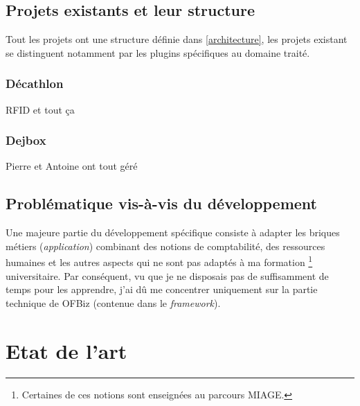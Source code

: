 \subsection{Projets existants et leur structure}
Tout les projets ont une structure définie dans \ref{architecture}, les projets existant se distinguent notamment par les plugins spécifiques au domaine traité. 
\subsubsection{Décathlon}
RFID et tout ça
\subsubsection{Dejbox}
Pierre et Antoine ont tout géré 

\subsection{Problématique vis-à-vis du développement}
\label{probfonctionnel}
Une majeure partie du développement spécifique consiste à adapter les briques métiers (\emph{application}) combinant des notions de comptabilité, des ressources humaines et les autres aspects qui ne sont pas adaptés à ma formation \footnote{Certaines de ces notions sont enseignées au parcours MIAGE.} universitaire. Par conséquent, vu que je ne disposais pas de suffisamment de temps pour les apprendre, j'ai dû me concentrer uniquement sur la partie technique de OFBiz (contenue dans le \emph{framework}).















\newpage


\section{Etat de l'art}

